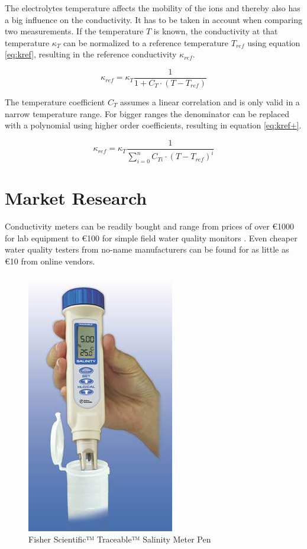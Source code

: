 The electrolytes temperature affects the mobility of the ions and thereby also has a big influence on the conductivity. It has to be taken in account when comparing two measurements. If the temperature $ T $ is known, the conductivity at that temperature $ \kappa_{T} $ can be normalized to a reference temperature $ T_{ref} $ using equation \eqref{eq:kref}, resulting in the reference conductivity $ \kappa_{ref} $.

\begin{equation}
	\kappa_{ref} = \kappa_{T} \frac{1}{1 + C_{T} \cdot (T - T_{ref})}
\label{eq:kref}
\end{equation}

The temperature coefficient $ C_{T} $ assumes a linear correlation and is only valid in a narrow temperature range. For bigger ranges the denominator can be replaced with a polynomial using higher order coefficients, resulting in equation \eqref{eq:kref+}.

\begin{equation}
	\kappa_{ref} = \kappa_{T} \frac{1}{\sum\limits_{i=0}^n C_{Ti} \cdot (T - T_{ref})^{i}}
\label{eq:kref+}
\end{equation}

\section{Market Research}

Conductivity meters can be readily bought and range from prices of over \euro{1000} for lab equipment \cite{expcm} to \euro{100} for simple field water quality monitors \cite{cheapcm}. Even cheaper water quality testers from no-name manufacturers can be found for as little as \euro{10} from online vendors.

\begin{figure}
	\begin{center}
    	\tikzset{external/export next=false}
		\includegraphics[scale=0.5]{images/ccm.jpg}
		\caption{Fisher Scientific™ Traceable™ Salinity Meter Pen \cite{cheapcm}}
		\label{fig:ccm}
	\end{center}
\end{figure}

